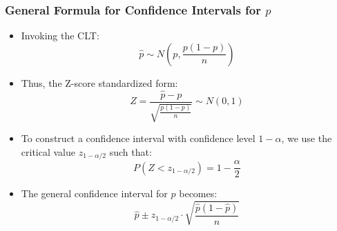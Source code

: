 \documentclass[handout]{beamer} %
\begin{document}
\begin{frame}
    \frametitle{General Formula for Confidence Intervals for $p$}
    \begin{itemize}
        \item Invoking the CLT:
        \[
        \hat{p} \sim N\left(p, \frac{p(1-p)}{n}\right)
        \]
        \item Thus, the Z-score standardized form:
        \[
        Z = \frac{\hat{p} - p}{\sqrt{\frac{p(1-p)}{n}}} \sim N\left( 0, 1 \right)
        \]
        \item To construct a confidence interval with confidence level \( 1 - \alpha \), we use the critical value \( z_{1-\alpha/2} \) such that:
        \[
        P\left(Z < z_{1-\alpha/2}\right) = 1 - \frac{\alpha}{2}
        \]
        \item The general confidence interval for \( p \) becomes:
        \[
        \hat{p} \pm z_{1-\alpha/2} \cdot \sqrt{\frac{\hat{p}(1 - \hat{p})}{n}}
        \]
    \end{itemize}
\end{frame}
\end{document}
